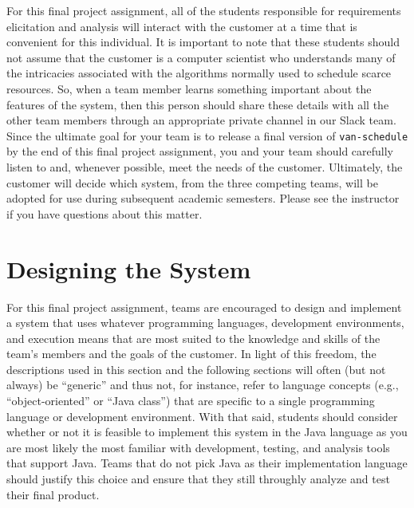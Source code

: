 For this final project assignment, all of the students responsible for requirements elicitation and analysis will
interact with the customer at a time that is convenient for this individual. It is important to note that these students
should not assume that the customer is a computer scientist who understands many of the intricacies associated with the
algorithms normally used to schedule scarce resources. So, when a team member learns something important about the
features of the system, then this person should share these details with all the other team members through an
appropriate private channel in our Slack team.  Since the ultimate goal for your team is to release a final version of
{\tt van-schedule} by the end of this final project assignment, you and your team should carefully listen to and,
whenever possible, meet the needs of the customer. Ultimately, the customer will decide which system, from the three
competing teams, will be adopted for use during subsequent academic semesters. Please see the instructor if you have
questions about this matter.

\vspace*{-.1in}
\section*{Designing the System}

For this final project assignment, teams are encouraged to design and implement a system that uses whatever programming
languages, development environments, and execution means that are most suited to the knowledge and skills of the team's
members and the goals of the customer.  In light of this freedom, the descriptions used in this section and the
following sections will often (but not always) be ``generic'' and thus not, for instance, refer to language concepts
(e.g., ``object-oriented'' or ``Java class'') that are specific to a single programming language or development
environment.  With that said, students should consider whether or not it is feasible to implement this system in the
Java language as you are most likely the most familiar with development, testing, and analysis tools that support Java.
Teams that do not pick Java as their implementation language should justify this choice and ensure that they still
throughly analyze and test their final product.


